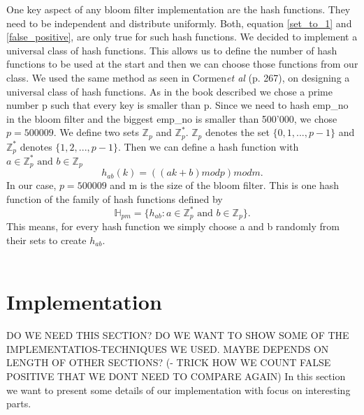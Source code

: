 \documentclass[12]{scrartcl}
\begin{document}
One key aspect of any bloom filter implementation are the hash functions. They need to be independent and distribute uniformly. Both, equation \ref{set_to_1} and \ref{false_positive}, are only true for such hash functions. We decided to implement a universal class of hash functions. This allows us to define the number of hash functions to be used at the start and then we can choose those functions from our class. We used the same method as seen in Cormen{\em et al}\cite{cormen} (p. 267), on designing a universal class of hash functions. As in the book described we chose a prime number p such that every key is smaller than p. Since we need to hash emp\_no in the bloom filter and the biggest emp\_no is smaller than 500'000, we chose $p = 500009$. We define two sets $\mathbb{Z}_p$ and $\mathbb{Z}_p^*$. $\mathbb{Z}_p$ denotes the set $\{0,1,...,p-1\}$ and $\mathbb{Z}_p^*$ denotes $\{1,2,...,p-1\}$. Then we can define a hash function with $a \in \mathbb{Z}_p^* \text{ and } b \in \mathbb{Z}_p$
\begin{equation}
	h_{ab}(k) = ((ak + b) \mathrel{mod} p) \mathrel{mod} m.
\end{equation}
In our case, $p = 500009$ and m is the size of the bloom filter. This is one hash function of the family of hash functions defined by
\begin{equation}
\mathbb{H}_{pm} = \{h_{ab} \mathrel{:} a \in \mathbb{Z}_p^* \text{ and } b \in \mathbb{Z}_p\}.
\end{equation}
This means, for every hash function we simply choose a and b randomly from their sets to create $h_{ab}$.\\\\

\section{Implementation}
DO WE NEED THIS SECTION? DO WE WANT TO SHOW SOME OF THE IMPLEMENTATIOS-TECHNIQUES WE USED. MAYBE DEPENDS ON LENGTH OF OTHER SECTIONS? (- TRICK HOW WE COUNT FALSE POSITIVE THAT WE DONT NEED TO COMPARE AGAIN)
In this section we want to present some details of our implementation with focus on interesting parts.
\end{document}
